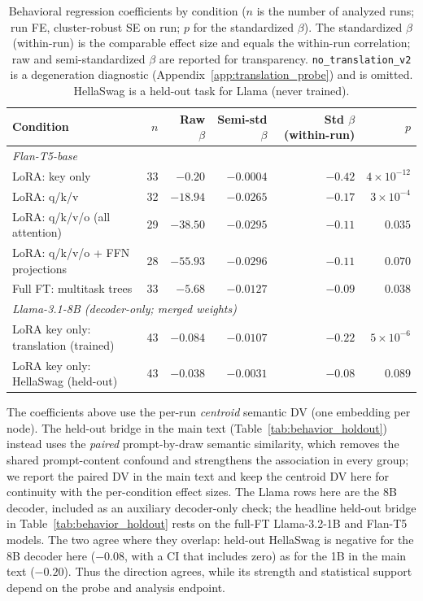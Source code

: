 \documentclass{article}
\theoremstyle{definition}
\theoremstyle{plain}
\begin{document}
\begin{table}[h]
\caption{Behavioral regression coefficients by condition ($n$ is the number of analyzed runs; run FE,
  cluster-robust SE on run; $p$ for
  the standardized $\beta$). The standardized $\beta$ (within-run) is the comparable effect size and
  equals the within-run correlation; raw and semi-standardized $\beta$ are reported for transparency.
  \texttt{no\_translation\_v2} is a degeneration diagnostic (Appendix~\ref{app:translation_probe}) and is
  omitted. HellaSwag is a held-out task for Llama (never trained).}
\label{tab:regression_betas}
\begin{center}
\small
\setlength{\tabcolsep}{3pt}
\begin{tabular}{lrrrrr}
\toprule
Condition & $n$ & Raw $\beta$ & Semi-std $\beta$ & Std $\beta$ (within-run) & $p$ \\
\midrule
\multicolumn{6}{l}{\textit{Flan-T5-base}} \\
LoRA: key only                   & 33 & $-0.20$  & $-0.0004$ & $-0.42$ & $4\!\times\!10^{-12}$ \\
LoRA: q/k/v                      & 32 & $-18.94$ & $-0.0265$ & $-0.17$ & $3\!\times\!10^{-4}$ \\
LoRA: q/k/v/o (all attention)   & 29 & $-38.50$ & $-0.0295$ & $-0.11$ & $0.035$ \\
LoRA: q/k/v/o + FFN projections & 28 & $-55.93$ & $-0.0296$ & $-0.11$ & $0.070$ \\
Full FT: multitask trees         & 33 & $-5.68$ & $-0.0127$ & $-0.09$ & $0.038$ \\
\midrule
\multicolumn{6}{l}{\textit{Llama-3.1-8B (decoder-only; merged weights)}} \\
LoRA key only: translation (trained) & 43 & $-0.084$ & $-0.0107$ & $-0.22$ & $5\!\times\!10^{-6}$ \\
LoRA key only: HellaSwag (held-out)  & 43 & $-0.038$ & $-0.0031$ & $-0.08$ & $0.089$ \\
\bottomrule
\end{tabular}
\end{center}
\end{table}

The coefficients above use the per-run \emph{centroid} semantic DV (one embedding per node). The
held-out bridge in the main text (Table~\ref{tab:behavior_holdout}) instead uses the \emph{paired}
prompt-by-draw semantic similarity, which removes the shared prompt-content confound and strengthens the
association in every group; we report the paired DV in the main text and keep the centroid DV here for
continuity with the per-condition effect sizes. The Llama rows here are the 8B decoder, included as an
auxiliary decoder-only check; the headline held-out bridge in Table~\ref{tab:behavior_holdout} rests on the
full-FT Llama-3.2-1B and Flan-T5 models. The two agree where they overlap: held-out HellaSwag is
negative for the 8B decoder here ($-0.08$, with a CI that includes zero) as for the 1B in the main text
($-0.20$). Thus the direction agrees, while its strength and statistical support depend on the probe
and analysis endpoint.
\end{document}
